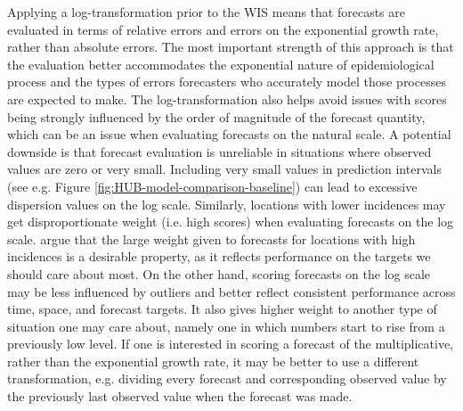 \documentclass{article}
\begin{document}
Applying a log-transformation prior to the WIS means that forecasts are evaluated in terms of relative errors and errors on the exponential growth rate, rather than absolute errors. The most important strength of this approach is that the evaluation better accommodates the exponential nature of epidemiological process and the types of errors forecasters who accurately model those processes are expected to make. The log-transformation also helps avoid issues with scores being strongly influenced by the order of magnitude of the forecast quantity, which can be an issue when evaluating forecasts on the natural scale. 
A potential downside is that forecast evaluation is unreliable in situations where observed values are zero or very small. Including very small values in prediction intervals (see e.g. Figure \ref{fig:HUB-model-comparison-baseline}) can lead to excessive dispersion values on the log scale. 
Similarly, locations with lower incidences may get disproportionate weight (i.e. high scores) when evaluating forecasts on the log scale. \cite{bracherEvaluatingEpidemicForecasts2021} argue that the large weight given to forecasts for locations with high incidences is a desirable property, as it reflects performance on the targets we should care about most. On the other hand, scoring forecasts on the log scale may be less influenced by outliers and better reflect consistent performance across time, space, and forecast targets. It also gives higher weight to another type of situation one may care about, namely one in which numbers start to rise from a previously low level. 
If one is interested in scoring a forecast of the multiplicative, rather than the exponential growth rate, it may be better to use a different transformation, e.g. dividing every forecast and corresponding observed value by the previously last observed value when the forecast was made. 
\end{document}
